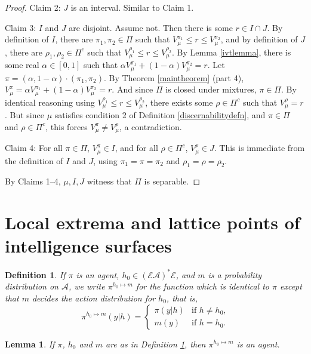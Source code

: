 \documentclass[twoside]{article}
\newtheorem{definition}[theorem]{Definition}
\newtheorem{lemma}[theorem]{Lemma}
\begin{document}
\begin{proof}
    Claim 2: $J$ is an interval. Similar to Claim 1.

    Claim 3: $I$ and $J$ are disjoint. Assume not. Then there is some $r\in I\cap J$.
    By definition of $I$, there are $\pi_1,\pi_2\in\Pi$ such that
    $V^{\pi_1}_\mu\leq r\leq V^{\pi_2}_\mu$, and by definition of $J$,
    there are $\rho_1,\rho_2\in\Pi^c$ such that $V^{\rho_1}_\mu\leq r\leq V^{\rho_2}_\mu$.
    By Lemma \ref{ivtlemma}, there is some real $\alpha\in [0,1]$
    such that $\alpha V^{\pi_1}_\mu + (1-\alpha)V^{\pi_2}_\mu=r$.
    Let $\pi=(\alpha,1-\alpha)\cdot (\pi_1,\pi_2)$.
    By Theorem \ref{maintheorem} (part 4),
    $V^\pi_\mu = \alpha V^{\pi_1}_\mu + (1-\alpha)V^{\pi_2}_\mu=r$.
    And since $\Pi$ is closed under mixtures, $\pi\in\Pi$.
    By identical reasoning using $V^{\rho_1}_\mu\leq r\leq V^{\rho_2}_\mu$,
    there exists some $\rho\in \Pi^c$ such that $V^\rho_\mu=r$.
    But since $\mu$ satisfies condition 2 of
    Definition \ref{discernabilitydefn}, 
    and $\pi\in\Pi$ and $\rho\in\Pi^c$, this forces
    $V^\pi_\mu\not=V^\rho_\mu$, a contradiction.

    Claim 4: For all $\pi\in \Pi$, $V^\pi_\mu\in I$, and for all $\rho\in\Pi^c$,
    $V^\rho_\mu\in J$. This is immediate from the definition of $I$ and $J$,
    using $\pi_1=\pi=\pi_2$ and $\rho_1=\rho=\rho_2$.

    By Claims 1--4, $\mu,I,J$ witness that $\Pi$ is separable.
\end{proof}

\section{Local extrema and lattice points of intelligence surfaces}

\begin{definition}
\label{modifyagentatoneplace}
    If $\pi$ is an agent, $h_0\in(\mathcal E\mathcal A)^*\mathcal E$,
    and $m$ is a probability distribution on $\mathcal A$,
    we write $\pi^{h_0\mapsto m}$ for the function which is identical to $\pi$
    except that $m$ decides the action distribution for
    $h_0$, that is,
    \[
        \pi^{h_0\mapsto m}(y|h)
        =
        \begin{cases}
            \pi(y|h) &\mbox{if $h\not=h_0$,}\\
            m(y) &\mbox{if $h=h_0$.}
        \end{cases}
    \]
\end{definition}

\begin{lemma}
    If $\pi$, $h_0$ and $m$ are as in Definition \ref{modifyagentatoneplace},
    then $\pi^{h_0\mapsto m}$ is an agent.
\end{lemma}
\end{document}
